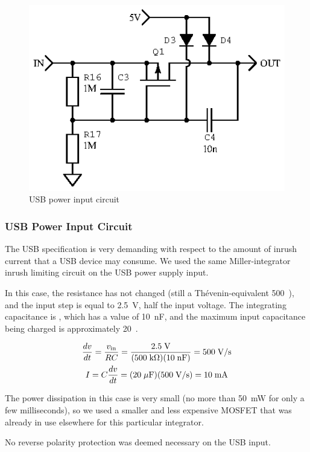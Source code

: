 \begin{figure}[H]
\centering
\includegraphics[]{usbinput}
\caption{USB power input circuit}
\label{fig:usbpower}
\end{figure}

\subsubsection{USB Power Input Circuit}


The USB specification is very demanding with respect to the amount of inrush
current that a USB device may consume. We used the same Miller-integrator
inrush limiting circuit on the USB power supply input.

In this case, the resistance has not changed (still a Th\'evenin-equivalent
500~\kOhm), and the input step is equal to 2.5~V, half the
input voltage. The integrating capacitance is , which has a value of 10~nF,
and the maximum input capacitance being charged is approximately 20~\uF.

\begin{gather*}
    \frac{dv}{dt} = \frac{v_{\mathrm{in}}}{RC} = \frac{2.5\;\mathrm{V}}{(500\;\mathrm{k\Omega})(10\;\mathrm{nF})}
    = 500\;\mathrm{V/s} \\
    I = C \frac{dv}{dt} = (20\;\mathrm{\mu F})(500\;\mathrm{V/s}) = 10\;\mathrm{mA}
\end{gather*}

The power dissipation in this case is very small (no more than 50~mW for
only a few milliseconds), so we used a smaller and less expensive MOSFET that
was already in use elsewhere for this particular integrator.

No reverse polarity protection was deemed necessary on the USB input.

